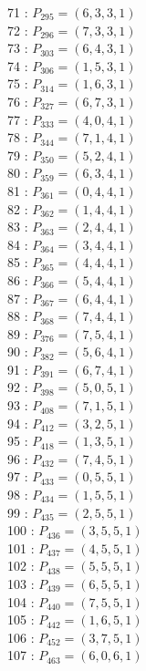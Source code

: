 \documentclass{article}
\begin{document}
{\begin{multicols}{3}
71 : $P_{295}=( 6, 3, 3, 1 )$\\
72 : $P_{296}=( 7, 3, 3, 1 )$\\
73 : $P_{303}=( 6, 4, 3, 1 )$\\
74 : $P_{306}=( 1, 5, 3, 1 )$\\
75 : $P_{314}=( 1, 6, 3, 1 )$\\
76 : $P_{327}=( 6, 7, 3, 1 )$\\
77 : $P_{333}=( 4, 0, 4, 1 )$\\
78 : $P_{344}=( 7, 1, 4, 1 )$\\
79 : $P_{350}=( 5, 2, 4, 1 )$\\
80 : $P_{359}=( 6, 3, 4, 1 )$\\
81 : $P_{361}=( 0, 4, 4, 1 )$\\
82 : $P_{362}=( 1, 4, 4, 1 )$\\
83 : $P_{363}=( 2, 4, 4, 1 )$\\
84 : $P_{364}=( 3, 4, 4, 1 )$\\
85 : $P_{365}=( 4, 4, 4, 1 )$\\
86 : $P_{366}=( 5, 4, 4, 1 )$\\
87 : $P_{367}=( 6, 4, 4, 1 )$\\
88 : $P_{368}=( 7, 4, 4, 1 )$\\
89 : $P_{376}=( 7, 5, 4, 1 )$\\
90 : $P_{382}=( 5, 6, 4, 1 )$\\
91 : $P_{391}=( 6, 7, 4, 1 )$\\
92 : $P_{398}=( 5, 0, 5, 1 )$\\
93 : $P_{408}=( 7, 1, 5, 1 )$\\
94 : $P_{412}=( 3, 2, 5, 1 )$\\
95 : $P_{418}=( 1, 3, 5, 1 )$\\
96 : $P_{432}=( 7, 4, 5, 1 )$\\
97 : $P_{433}=( 0, 5, 5, 1 )$\\
98 : $P_{434}=( 1, 5, 5, 1 )$\\
99 : $P_{435}=( 2, 5, 5, 1 )$\\
100 : $P_{436}=( 3, 5, 5, 1 )$\\
101 : $P_{437}=( 4, 5, 5, 1 )$\\
102 : $P_{438}=( 5, 5, 5, 1 )$\\
103 : $P_{439}=( 6, 5, 5, 1 )$\\
104 : $P_{440}=( 7, 5, 5, 1 )$\\
105 : $P_{442}=( 1, 6, 5, 1 )$\\
106 : $P_{452}=( 3, 7, 5, 1 )$\\
107 : $P_{463}=( 6, 0, 6, 1 )$\\

\end{multicols}}
\end{document}
